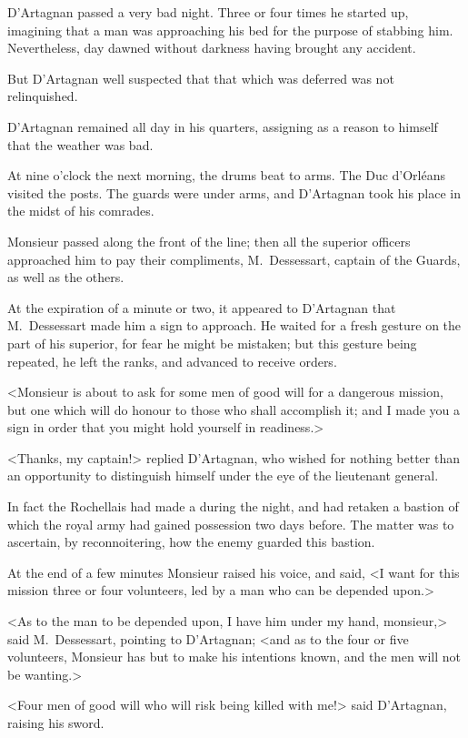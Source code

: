 D'Artagnan passed a very bad night. Three or four times he started up, imagining that a man was approaching his bed for the purpose of stabbing him. Nevertheless, day dawned without darkness having brought any accident. 

But D'Artagnan well suspected that that which was deferred was not relinquished. 

D'Artagnan remained all day in his quarters, assigning as a reason to himself that the weather was bad. 

At nine o'clock the next morning, the drums beat to arms. The Duc d'Orléans visited the posts. The guards were under arms, and D'Artagnan took his place in the midst of his comrades. 

Monsieur passed along the front of the line; then all the superior officers approached him to pay their compliments, M.~Dessessart, captain of the Guards, as well as the others. 

At the expiration of a minute or two, it appeared to D'Artagnan that M.~Dessessart made him a sign to approach. He waited for a fresh gesture on the part of his superior, for fear he might be mistaken; but this gesture being repeated, he left the ranks, and advanced to receive orders. 

<Monsieur is about to ask for some men of good will for a dangerous mission, but one which will do honour to those who shall accomplish it; and I made you a sign in order that you might hold yourself in readiness.> 

<Thanks, my captain!> replied D'Artagnan, who wished for nothing better than an opportunity to distinguish himself under the eye of the lieutenant general. 

In fact the Rochellais had made a  during the night, and had retaken a bastion of which the royal army had gained possession two days before. The matter was to ascertain, by reconnoitering, how the enemy guarded this bastion. 

At the end of a few minutes Monsieur raised his voice, and said, <I want for this mission three or four volunteers, led by a man who can be depended upon.> 

<As to the man to be depended upon, I have him under my hand, monsieur,> said M.~Dessessart, pointing to D'Artagnan; <and as to the four or five volunteers, Monsieur has but to make his intentions known, and the men will not be wanting.> 

<Four men of good will who will risk being killed with me!> said D'Artagnan, raising his sword. 

